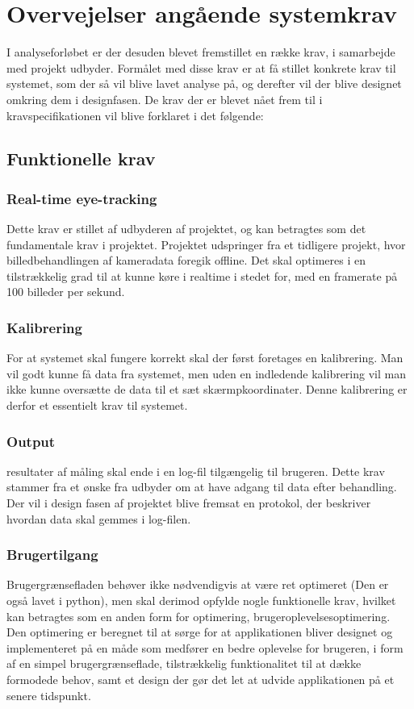 \documentclass[analyse.tex]{subfiles}
\begin{document}
\section{Overvejelser angående systemkrav}
I analyseforløbet er der desuden blevet fremstillet en række krav, i samarbejde med projekt
udbyder. Formålet med disse krav er at få stillet konkrete krav til systemet, som der så vil
blive lavet analyse på, og derefter vil der blive designet omkring dem i designfasen.
De krav der er blevet nået frem til i kravspecifikationen vil blive forklaret i det følgende:
	
\subsection{Funktionelle krav}


\subsubsection{Real-time eye-tracking}
Dette krav er stillet af udbyderen af projektet, og kan
betragtes som det fundamentale krav i projektet. Projektet udspringer fra et tidligere
projekt, hvor billedbehandlingen af kameradata foregik offline. Det skal optimeres i
en tilstrækkelig grad til at kunne køre i realtime i stedet for, med en framerate på
100 billeder per sekund.


\subsubsection{Kalibrering}
For at systemet skal fungere korrekt skal der først foretages en kalibrering.
Man vil godt kunne få data fra systemet, men uden en indledende kalibrering vil man ikke
kunne oversætte de data til et sæt skærmpkoordinater. Denne kalibrering er derfor
et essentielt krav til systemet.


\subsubsection{Output}
resultater af måling skal ende i en log-fil tilgængelig til brugeren. Dette krav
stammer fra et ønske fra udbyder om at have adgang til data efter behandling. Der vil i
design fasen af projektet blive fremsat en protokol, der beskriver hvordan data skal
gemmes i log-filen. 


\subsubsection{Brugertilgang}
Brugergrænsefladen behøver ikke nødvendigvis at være ret optimeret (Den er også lavet i python),
men skal derimod opfylde nogle funktionelle krav, hvilket kan betragtes som en
anden form for optimering, brugeroplevelsesoptimering. Den optimering er beregnet til at
sørge for at applikationen bliver designet og implementeret på en måde som medfører en
bedre oplevelse for brugeren, i form af en simpel brugergrænseflade, tilstrækkelig
funktionalitet til at dække formodede behov, samt et design der gør det let at udvide
applikationen på et senere tidspunkt.
\end{document}
